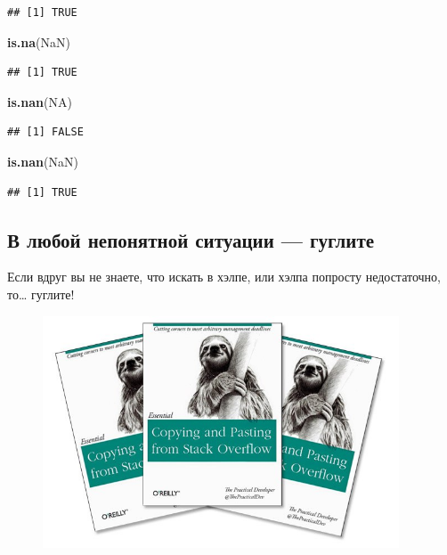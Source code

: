 \documentclass[]{book}
\newenvironment{Shaded}{\begin{snugshade}}{\end{snugshade}}
\newcommand{\KeywordTok}[1]{\textcolor[rgb]{0.13,0.29,0.53}{\textbf{#1}}}
\newcommand{\OtherTok}[1]{\textcolor[rgb]{0.56,0.35,0.01}{#1}}
\newcommand{\NormalTok}[1]{#1}
\begin{document}
\begin{verbatim}
## [1] TRUE
\end{verbatim}

\begin{Shaded}
\begin{Highlighting}[]
\KeywordTok{is.na}\NormalTok{(}\OtherTok{NaN}\NormalTok{)}
\end{Highlighting}
\end{Shaded}

\begin{verbatim}
## [1] TRUE
\end{verbatim}

\begin{Shaded}
\begin{Highlighting}[]
\KeywordTok{is.nan}\NormalTok{(}\OtherTok{NA}\NormalTok{)}
\end{Highlighting}
\end{Shaded}

\begin{verbatim}
## [1] FALSE
\end{verbatim}

\begin{Shaded}
\begin{Highlighting}[]
\KeywordTok{is.nan}\NormalTok{(}\OtherTok{NaN}\NormalTok{)}
\end{Highlighting}
\end{Shaded}

\begin{verbatim}
## [1] TRUE
\end{verbatim}

\subsection{В любой непонятной ситуации --- гуглите}\label{google}

Если вдруг вы не знаете, что искать в хэлпе, или хэлпа попросту
недостаточно, то\ldots{} гуглите!

\begin{figure}
\centering
\includegraphics[width=4.16667in]{images/2AmXWgVoULk.jpg}
\caption{}
\end{figure}
\end{document}
